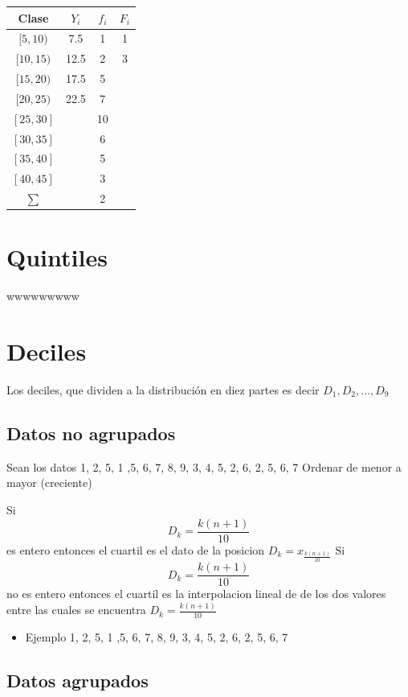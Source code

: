 \documentclass[10pt,]{krantz}
\providecommand{\tightlist}{%
  \setlength{\itemsep}{0pt}\setlength{\parskip}{0pt}}
\theoremstyle{definition}
\theoremstyle{definition}
\theoremstyle{definition}
\theoremstyle{definition}
\theoremstyle{remark}
\begin{document}
\begin{longtable}[]{@{}cccc@{}}
\toprule
Clase & \(Y_i\) & \(f_i\) & \(F_i\)\tabularnewline
\midrule
\endhead
\([5,10)\) & 7.5 & 1 & 1\tabularnewline
\([10,15)\) & 12.5 & 2 & 3\tabularnewline
\([15,20)\) & 17.5 & 5 &\tabularnewline
\([20,25)\) & 22.5 & 7 &\tabularnewline
\([25,30]\) & & 10 &\tabularnewline
\([30,35]\) & & 6 &\tabularnewline
\([35,40]\) & & 5 &\tabularnewline
\([40,45]\) & & 3 &\tabularnewline
\(\sum\) & & 2 &\tabularnewline
\bottomrule
\end{longtable}

\hypertarget{quintiles}{%
\section{Quintiles}\label{quintiles}}

wwwwwwwww

\hypertarget{deciles}{%
\section{Deciles}\label{deciles}}

Los deciles, que dividen a la distribución en diez partes es decir \(D_1, D_2,\ldots, D_9\)

\hypertarget{datos-no-agrupados-1}{%
\subsection{Datos no agrupados}\label{datos-no-agrupados-1}}

Sean los datos 1, 2, 5, 1 ,5, 6, 7, 8, 9, 3, 4, 5, 2, 6, 2, 5, 6, 7 Ordenar de menor a mayor (creciente)

Si \[D_k=\frac{k(n+1)}{10}\] es entero entonces el cuartil es el dato de la posicion \(D_k=x_\frac{k(n+1)}{10}\)
Si \[D_k=\frac{k(n+1)}{10}\] no es entero entonces el cuartil es la interpolacion lineal de de los dos valores entre las cuales se encuentra \(D_k=\frac{k(n+1)}{10}\)

\begin{itemize}
\tightlist
\item
  Ejemplo
  1, 2, 5, 1 ,5, 6, 7, 8, 9, 3, 4, 5, 2, 6, 2, 5, 6, 7
\end{itemize}

\hypertarget{datos-agrupados-1}{%
\subsection{Datos agrupados}\label{datos-agrupados-1}}
\end{document}
